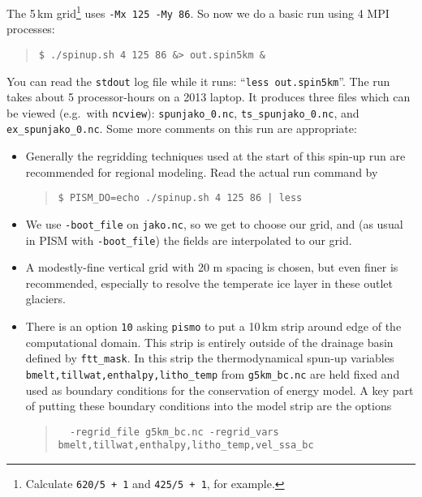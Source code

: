 The 5\,km grid\footnote{Calculate \texttt{620/5 + 1} and \texttt{425/5 + 1}, for example.} uses \texttt{-Mx 125 -My 86}.  So now we do a basic run using 4 MPI processes:
\begin{quote}\small
\begin{verbatim}
$ ./spinup.sh 4 125 86 &> out.spin5km &
\end{verbatim}
\normalsize\end{quote}
You can read the \texttt{stdout} log file while it runs: ``\texttt{less out.spin5km}''.  The run takes about 5 processor-hours on a 2013 laptop.   %
It produces three files which can be viewed (e.g.~with \texttt{ncview}): \texttt{spunjako_0.nc}, \texttt{ts_spunjako_0.nc}, and \texttt{ex_spunjako_0.nc}.  Some more comments on this run are appropriate:
\begin{itemize}
\item Generally the regridding techniques used at the start of this spin-up run are recommended for regional modeling.  Read the actual run command by
\begin{quote}\small
\begin{verbatim}
$ PISM_DO=echo ./spinup.sh 4 125 86 | less
\end{verbatim}
\normalsize\end{quote}
\item  We use \texttt{-boot_file} on \texttt{jako.nc}, so we get to choose our grid, and (as usual in PISM with \texttt{-boot_file}) the fields are interpolated to our grid.
\item A modestly-fine vertical grid with 20 m spacing is chosen, but even finer is recommended, especially to resolve the temperate ice layer in these outlet glaciers.
\item There is an option  \texttt{10} asking \texttt{pismo} to put a 10\,km strip around edge of the computational domain.  This strip is entirely outside of the drainage basin defined by \texttt{ftt_mask}.  In this strip the thermodynamical spun-up variables \texttt{bmelt,tillwat,enthalpy,litho_temp} from \texttt{g5km_bc.nc} are held fixed and used as boundary conditions for the conservation of energy model.  A key part of putting these boundary conditions into the model strip are the options
\begin{quote}\small
\begin{verbatim}
  -regrid_file g5km_bc.nc -regrid_vars bmelt,tillwat,enthalpy,litho_temp,vel_ssa_bc
\end{verbatim}

\end{quote}
\end{itemize}
